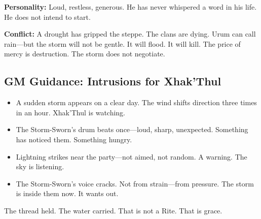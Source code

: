 \textbf{Personality:} Loud, restless, generous. He has never whispered a word in his life. He does not intend to start.

\textbf{Conflict:} A drought has gripped the steppe. The clans are dying. Urum can call rain—but the storm will not be gentle. It will flood. It will kill. The price of mercy is destruction. The storm does not negotiate.

\subsection{GM Guidance: Intrusions for Xhak'Thul}

\begin{itemize}
\item A sudden storm appears on a clear day. The wind shifts direction three times in an hour. Xhak'Thul is watching.
\item The Storm-Sworn's drum beats once—loud, sharp, unexpected. Something has noticed them. Something hungry.
\item Lightning strikes near the party—not aimed, not random. A warning. The sky is listening.
\item The Storm-Sworn's voice cracks. Not from strain—from pressure. The storm is inside them now. It wants out.
\end{itemize}

The thread held. The water carried. That is not a Rite. That is grace.
